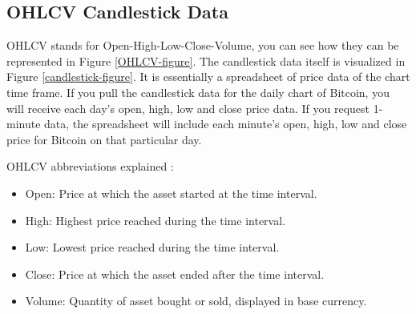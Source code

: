 \subsection*{OHLCV Candlestick Data}
\label{ohlcv-candlestick-data}
OHLCV stands for Open-High-Low-Close-Volume, you can see how they can be represented in Figure \ref{OHLCV-figure}. The candlestick data itself is visualized in Figure \ref{candlestick-figure}. It is essentially a spreadsheet of price data of the chart time frame. If you pull the candlestick data for the daily chart of Bitcoin, you will receive each day's open, high, low and close price data. If you request 1-minute data, the spreadsheet will include each minute's open, high, low and close price for Bitcoin on that particular day.

OHLCV abbreviations explained \cite{kaiko-ohlcv}:
\begin{itemize}
    \item Open: Price at which the asset started at the time interval.
    \item High: Highest price reached during the time interval.
    \item Low: Lowest price reached during the time interval.
    \item Close: Price at which the asset ended after the time interval.
    \item Volume: Quantity of asset bought or sold, displayed in base currency.
\end{itemize}

